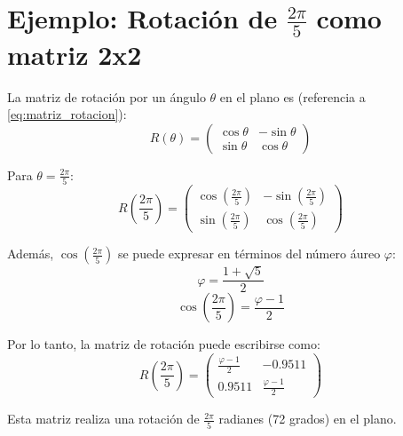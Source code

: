 \section{Ejemplo: Rotación de $\frac{2\pi}{5}$ como matriz 2x2}\label{sec:ejemplo}
La matriz de rotación por un ángulo $\theta$ en el plano es (referencia a \eqref{eq:matriz_rotacion}):
\begin{equation}\label{eq:matriz_rotacion_general}
R(\theta) = \begin{pmatrix}
\cos \theta & -\sin \theta \\
\sin \theta & \cos \theta
\end{pmatrix}
\end{equation}

Para $\theta = \frac{2\pi}{5}$:
\begin{equation}\label{eq:matriz_2pi_5}
R\left(\frac{2\pi}{5}\right) = \begin{pmatrix}
\cos\left(\frac{2\pi}{5}\right) & -\sin\left(\frac{2\pi}{5}\right) \\
\sin\left(\frac{2\pi}{5}\right) & \cos\left(\frac{2\pi}{5}\right)
\end{pmatrix}
\end{equation}

Además, $\cos\left(\frac{2\pi}{5}\right)$ se puede expresar en términos del número áureo $\varphi$:
\begin{equation}\label{eq:numero_aureo}
\varphi = \frac{1 + \sqrt{5}}{2}
\end{equation}
\begin{equation}\label{eq:cos_2pi_5_aureo}
\cos\left(\frac{2\pi}{5}\right) = \frac{\varphi - 1}{2}
\end{equation}

Por lo tanto, la matriz de rotación puede escribirse como:
\begin{equation*}
R\left(\frac{2\pi}{5}\right) = \begin{pmatrix}
\frac{\varphi - 1}{2} & -0.9511 \\
0.9511 & \frac{\varphi - 1}{2}
\end{pmatrix}
\end{equation*}

Esta matriz realiza una rotación de $\frac{2\pi}{5}$ radianes (72 grados) en el plano.
